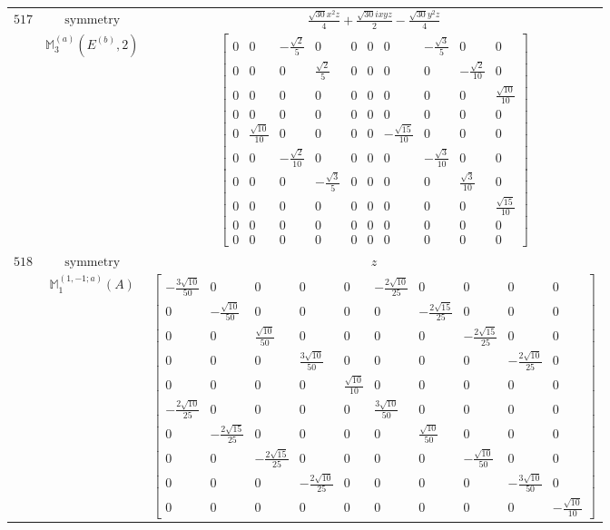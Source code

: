 \documentclass[fleqn,8pt,landscape]{jsarticle}
\begin{document}
\begin{longtable}{ccc}
$ 517 $ & $ \text{symmetry} $ & $ \frac{\sqrt{30} x^{2} z}{4} + \frac{\sqrt{30} i x y z}{2} - \frac{\sqrt{30} y^{2} z}{4} $ \\
$  $ & $ \mathbb{M}_{3}^{(a)}(E^{(b)},2) $ & $ \begin{bmatrix} 0 & 0 & - \frac{\sqrt{2}}{5} & 0 & 0 & 0 & 0 & - \frac{\sqrt{3}}{5} & 0 & 0 \\ 0 & 0 & 0 & \frac{\sqrt{2}}{5} & 0 & 0 & 0 & 0 & - \frac{\sqrt{2}}{10} & 0 \\ 0 & 0 & 0 & 0 & 0 & 0 & 0 & 0 & 0 & \frac{\sqrt{10}}{10} \\ 0 & 0 & 0 & 0 & 0 & 0 & 0 & 0 & 0 & 0 \\ 0 & \frac{\sqrt{10}}{10} & 0 & 0 & 0 & 0 & - \frac{\sqrt{15}}{10} & 0 & 0 & 0 \\ 0 & 0 & - \frac{\sqrt{2}}{10} & 0 & 0 & 0 & 0 & - \frac{\sqrt{3}}{10} & 0 & 0 \\ 0 & 0 & 0 & - \frac{\sqrt{3}}{5} & 0 & 0 & 0 & 0 & \frac{\sqrt{3}}{10} & 0 \\ 0 & 0 & 0 & 0 & 0 & 0 & 0 & 0 & 0 & \frac{\sqrt{15}}{10} \\ 0 & 0 & 0 & 0 & 0 & 0 & 0 & 0 & 0 & 0 \\ 0 & 0 & 0 & 0 & 0 & 0 & 0 & 0 & 0 & 0 \end{bmatrix} $ \\ \hline
$ 518 $ & $ \text{symmetry} $ & $ z $ \\
$  $ & $ \mathbb{M}_{1}^{(1,-1;a)}(A) $ & $ \begin{bmatrix} - \frac{3 \sqrt{10}}{50} & 0 & 0 & 0 & 0 & - \frac{2 \sqrt{10}}{25} & 0 & 0 & 0 & 0 \\ 0 & - \frac{\sqrt{10}}{50} & 0 & 0 & 0 & 0 & - \frac{2 \sqrt{15}}{25} & 0 & 0 & 0 \\ 0 & 0 & \frac{\sqrt{10}}{50} & 0 & 0 & 0 & 0 & - \frac{2 \sqrt{15}}{25} & 0 & 0 \\ 0 & 0 & 0 & \frac{3 \sqrt{10}}{50} & 0 & 0 & 0 & 0 & - \frac{2 \sqrt{10}}{25} & 0 \\ 0 & 0 & 0 & 0 & \frac{\sqrt{10}}{10} & 0 & 0 & 0 & 0 & 0 \\ - \frac{2 \sqrt{10}}{25} & 0 & 0 & 0 & 0 & \frac{3 \sqrt{10}}{50} & 0 & 0 & 0 & 0 \\ 0 & - \frac{2 \sqrt{15}}{25} & 0 & 0 & 0 & 0 & \frac{\sqrt{10}}{50} & 0 & 0 & 0 \\ 0 & 0 & - \frac{2 \sqrt{15}}{25} & 0 & 0 & 0 & 0 & - \frac{\sqrt{10}}{50} & 0 & 0 \\ 0 & 0 & 0 & - \frac{2 \sqrt{10}}{25} & 0 & 0 & 0 & 0 & - \frac{3 \sqrt{10}}{50} & 0 \\ 0 & 0 & 0 & 0 & 0 & 0 & 0 & 0 & 0 & - \frac{\sqrt{10}}{10} \end{bmatrix} $ \\ \hline

\end{longtable}
\end{document}
